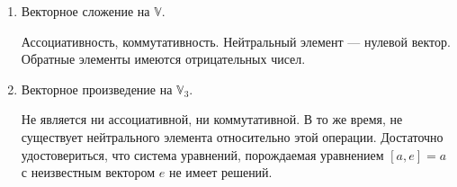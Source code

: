 \begin{task}
\begin{enumerate}
        \item Векторное сложение на $\mathbb{V}$.\\
        \begin{solution}
            Ассоциативность, коммутативность. Нейтральный элемент --- нулевой вектор. Обратные элементы имеются отрицательных чисел.
        \end{solution}

        \item Векторное произведение на $\mathbb{V}_3$.\\
        \begin{solution}
            Не является ни ассоциативной, ни коммутативной. В то же время, не существует нейтрального элемента относительно этой операции. Достаточно удостовериться, что система уравнений, порождаемая уравнением $[a,e]=a$ с неизвестным вектором $e$ не имеет решений.
        \end{solution}
    \end{enumerate}
\end{task}

